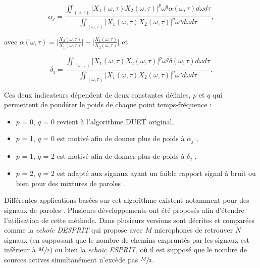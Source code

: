 \begin{equation}
\alpha_j = \frac{\iint_{(\omega,\tau)} \vert X_1(\omega,\tau) X_2(\omega,\tau)\vert ^p \omega^q \alpha(\omega,\tau) d\omega d\tau}{\iint_{(\omega,\tau)}\vert X_1(\omega,\tau) X_2(\omega,\tau)\vert ^p \omega^q d\omega d\tau},
\end{equation}

avec $\alpha(\omega,\tau) = \bigg\vert \frac{X_2(\omega,\tau)}{X_1(\omega,\tau)} \bigg\vert - \bigg\vert  \frac{X_1(\omega,\tau)}{X_2(\omega,\tau)} \bigg\vert$ et

\begin{equation}
\delta_j = \frac{\iint_{(\omega,\tau)} \vert X_1(\omega,\tau) X_2(\omega,\tau)\vert ^p \omega^q \tilde{\delta}(\omega,\tau) d\omega d\tau}{\iint_{(\omega,\tau)}\vert X_1(\omega,\tau) X_2(\omega,\tau)\vert ^p \omega^q d\omega d\tau}.
\end{equation}

Ces deux indicateurs dépendent de deux constantes définies, $p$ et $q$ qui permettent de pondérer le poids de chaque point temps-fréquence :

\begin{itemize}
\item $p$ = 0, $q$ = 0 revient à l'algorithme DUET original,
\item $p$ = 1, $q$ = 0 est motivé afin de donner plus de poids à $\alpha_j$ \cite{yilmaz2004blind},
\item $p$ = 1, $q$ = 2 est motivé afin de donner plus de poids à $\delta_j$ \cite{yilmaz2004blind},
\item $p$ = 2, $q$ = 2 est adapté aux signaux ayant un faible rapport signal à bruit ou bien pour des mixtures de paroles \cite{melia2007underdetermined}.\\
\end{itemize}

Différentes applications basées sur cet algorithme existent notamment pour des signaux de paroles \cite{yilmaz2004blind, jourjine2000blind}.
Plusieurs développements ont été proposés afin d'étendre l'utilisation de cette méthode. Dans  \cite{melia2007underdetermined} plusieurs versions sont décrites et comparées comme la \textit{echoic DESPRIT} qui propose avec $M$ microphones de retrouver $N$ signaux (en supposant que le nombre de chemins empruntés par les signaux est inférieur à $\sfrac{M}{2}$) ou bien la \textit{echoic ESPRIT}, où il est supposé que le nombre de sources actives simultanément n'excède pas $\sfrac{M}{2}$. \\

